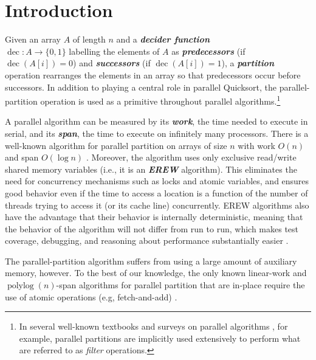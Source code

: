 \documentclass[sigconf]{acmart}
\newcommand{\dec}{\operatorname{dec}}
\newcommand{\defn}[1]{{\textit{\textbf{\boldmath #1}}}}
\theoremstyle{remark}
\theoremstyle{remark}
\begin{document}


\maketitle
\section{Introduction}

Given an array $A$ of length $n$ and a \defn{decider function} \\$\dec: A \to \{0, 1\}$
labelling the elements of $A$ as \defn{predecessors} (if $\dec(A[i])=0$) and
\defn{successors} (if $\dec(A[i])=1$), a \defn{partition} operation rearranges the
elements in an array so that predecessors occur before successors. In addition
to playing a central role in parallel Quicksort, the parallel-partition
operation is used as a primitive throughout parallel algorithms.\footnote{In
  several well-known textbooks and surveys on parallel algorithms
\cite{AcarBl16,Blelloch96}, for example, parallel partitions are implicitly
used extensively to perform what are referred to as \emph{filter} operations.}

A parallel algorithm can be measured by its \defn{work}, the time
needed to execute in serial, and its \defn{span}, the time to execute
on infinitely many processors. There is a well-known algorithm for
parallel partition on arrays of size $n$ with work $O(n)$ and span
$O(\log n)$ \cite{Blelloch96,AcarBl16}. Moreover, the algorithm uses
only exclusive read/write shared memory variables (i.e., it is an
\defn{EREW} algorithm). This eliminates the need for concurrency
mechanisms such as locks and atomic variables, and ensures good
behavior even if the time to access a location is a function of the
number of threads trying to access it (or its cache line)
concurrently. EREW algorithms also have the advantage that their
behavior is internally deterministic, meaning that
the behavior of the algorithm will not differ from run to run, which
makes test coverage, debugging, and reasoning about performance
substantially easier \cite{BlellochFi12}.

The parallel-partition algorithm suffers from using a large amount of
auxiliary memory, however. To the best of our knowledge, the only
known linear-work and $\operatorname{polylog}(n)$-span algorithms for
parallel partition that are in-place require the use of atomic
operations (e.g, fetch-and-add)
\cite{HeidelbergerNo90,AxtmannWi17,TsigasZh03}.
\end{document}
